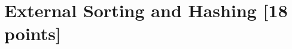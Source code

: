 \documentclass[10pt]{article}
\begin{document}



\section{ \textbf{External Sorting and Hashing [18 points]}}
\end{document}
